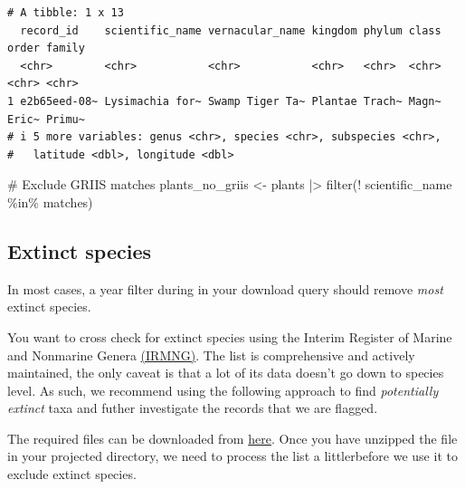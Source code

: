 \documentclass[
  letterpaper,
  DIV=11,
  numbers=noendperiod,
  oneside]{scrreprt}
\newenvironment{Shaded}{\begin{snugshade}}{\end{snugshade}}
\newcommand{\CommentTok}[1]{\textcolor[rgb]{0.37,0.37,0.37}{#1}}
\newcommand{\FunctionTok}[1]{\textcolor[rgb]{0.28,0.35,0.67}{#1}}
\newcommand{\NormalTok}[1]{\textcolor[rgb]{0.00,0.23,0.31}{#1}}
\newcommand{\OtherTok}[1]{\textcolor[rgb]{0.00,0.23,0.31}{#1}}
\newcommand{\SpecialCharTok}[1]{\textcolor[rgb]{0.37,0.37,0.37}{#1}}
\begin{document}
\begin{verbatim}
# A tibble: 1 x 13
  record_id    scientific_name vernacular_name kingdom phylum class order family
  <chr>        <chr>           <chr>           <chr>   <chr>  <chr> <chr> <chr> 
1 e2b65eed-08~ Lysimachia for~ Swamp Tiger Ta~ Plantae Trach~ Magn~ Eric~ Primu~
# i 5 more variables: genus <chr>, species <chr>, subspecies <chr>,
#   latitude <dbl>, longitude <dbl>
\end{verbatim}

\begin{Shaded}
\begin{Highlighting}[]
\CommentTok{\# Exclude GRIIS matches}
\NormalTok{plants\_no\_griis }\OtherTok{\textless{}{-}}\NormalTok{ plants }\SpecialCharTok{|\textgreater{}} \FunctionTok{filter}\NormalTok{(}\SpecialCharTok{!}\NormalTok{ scientific\_name }\SpecialCharTok{\%in\%}\NormalTok{ matches)}
\end{Highlighting}
\end{Shaded}

\hypertarget{extinct-species}{%
\subsection{Extinct species}\label{extinct-species}}

In most cases, a year filter during in your download query should remove
\emph{most} extinct species.

You want to cross check for extinct species using the Interim Register
of Marine and Nonmarine Genera \href{https://www.irmng.org/}{(IRMNG)}.
The list is comprehensive and actively maintained, the only caveat is
that a lot of its data doesn't go down to species level. As such, we
recommend using the following approach to find \emph{potentially
extinct} taxa and futher investigate the records that we are flagged.

The required files can be downloaded from
\href{https://www.irmng.org/export/}{here}. Once you have unzipped the
file in your projected directory, we need to process the list a
littlerbefore we use it to exclude extinct species.
\end{document}
